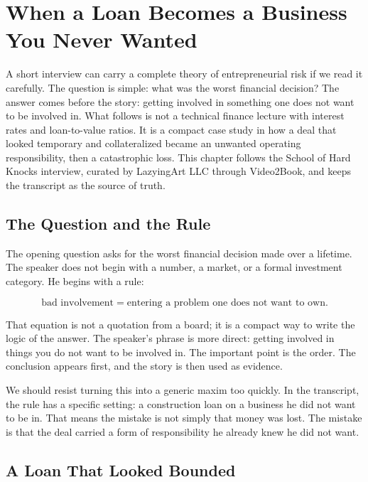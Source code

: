 \chapter{When a Loan Becomes a Business You Never Wanted}

A short interview can carry a complete theory of entrepreneurial risk if we read it carefully. The question is simple: what was the worst financial decision? The answer comes before the story: getting involved in something one does not want to be involved in. What follows is not a technical finance lecture with interest rates and loan-to-value ratios. It is a compact case study in how a deal that looked temporary and collateralized became an unwanted operating responsibility, then a catastrophic loss. This chapter follows the School of Hard Knocks interview, curated by LazyingArt LLC through Video2Book, and keeps the transcript as the source of truth.

\section{The Question and the Rule}

The opening question asks for the worst financial decision made over a lifetime. The speaker does not begin with a number, a market, or a formal investment category. He begins with a rule:

\begin{equation}
\text{bad involvement}
=
\text{entering a problem one does not want to own}.
\end{equation}

That equation is not a quotation from a board; it is a compact way to write the logic of the answer. The speaker's phrase is more direct: getting involved in things you do not want to be involved in. The important point is the order. The conclusion appears first, and the story is then used as evidence.

We should resist turning this into a generic maxim too quickly. In the transcript, the rule has a specific setting: a construction loan on a business he did not want to be in. That means the mistake is not simply that money was lost. The mistake is that the deal carried a form of responsibility he already knew he did not want.

\section{A Loan That Looked Bounded}


